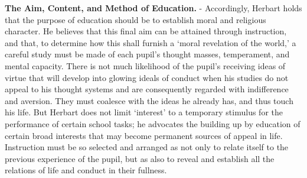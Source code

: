 \documentclass[]{book}
\begin{document}
\textbf{The Aim, Content, and Method of Education.} - Accordingly, Herbart holds that the purpose of education should be to establish moral and religious character. He believes that this final aim can be attained through instruction, and that, to determine how this shall furnish a `moral revelation of the world,' a careful study must be made of each pupil's thought masses, temperament, and mental capacity. There is not much likelihood of the pupil's receiving ideas of virtue that will develop into glowing ideals of conduct when his studies do not appeal to his thought systems and are consequently regarded with indifference and aversion. They must coalesce with the ideas he already has, and thus touch his life. But Herbart does not limit `interest' to a temporary stimulus for the performance of certain school tasks; he advocates the building up by education of certain broad interests that may become permanent sources of appeal in life. Instruction must be so selected and arranged as not only to relate itself to the previous experience of the pupil, but as also to reveal and establish all the relations of life and conduct in their fullness.
\end{document}

